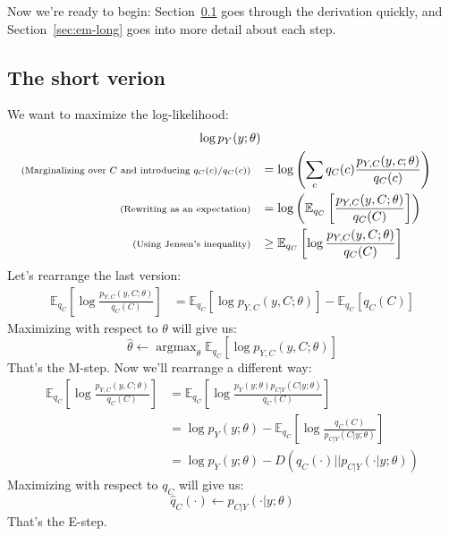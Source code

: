 \documentclass[12pt]{article}
\DeclareMathOperator*{\argmax}{\mathrm{argmax}}
\begin{document}
    Now we're ready to begin: Section~\ref{sec:em-short} goes through the
    derivation quickly, and Section~\ref{sec:em-long} goes into more detail
    about each step.
    \subsection{The short verion}
    \label{sec:em-short}
    We want to maximize the log-likelihood:
    \begin{align*}
        \log p_Y(y; \theta) \\
        \scriptsize{\text{(Marginalizing over $C$ and introducing $q_C(c)/q_C(c)$)}}\quad
            &= \log\left(\sum_c q_C(c) \frac{p_{Y,C}(y,c; \theta)}{q_C(c)}\right) \\
            \scriptsize{\text{(Rewriting as an expectation)}}\quad
            &= \log\left(\mathbb{E}_{q_C}\left[\frac{p_{Y,C}(y,C; \theta)}{q_C(C)}\right]\right)\\
            \scriptsize{\text{(Using Jensen's inequality)}}\quad
            &\geq \mathbb{E}_{q_C}\left[\log \frac{p_{Y,C}(y,C; \theta)}{q_C(C)} \right]
    \end{align*}
    Let's rearrange the last version:
    \begin{align*}
        \mathbb{E}_{q_C}\left[\log \frac{p_{Y,C}(y,C; \theta)}{q_C(C)} \right]
        &= \mathbb{E}_{q_C}\left[\log p_{Y,C}(y,C; \theta)\right] - \mathbb{E}_{q_C} [q_C(C)]
    \end{align*}
    Maximizing with respect to $\theta$ will give us:
    \begin{equation*}
        \boxed{\widehat{\theta} \gets \argmax_\theta \mathbb{E}_{q_C}\left[\log p_{Y,C}(y,C; \theta)\right]}
    \end{equation*}
    That's the M-step. Now we'll rearrange a different way:
    \begin{align*}
        \mathbb{E}_{q_C}\left[\log \frac{p_{Y,C}(y,C; \theta)}{q_C(C)} \right] 
        &= \mathbb{E}_{q_C}\left[\log \frac{p_{Y}(y; \theta)p_{C|Y}(C|y; \theta)}{q_C(C)} \right] \\
        &= \log p_{Y}(y; \theta) - \mathbb{E}_{q_C}\left[\log \frac{q_C(C)}{p_{C|Y}(C|y; \theta)}\right] \\
        &= \log p_{Y}(y; \theta) - D(q_C(\cdot)||p_{C|Y}(\cdot|y; \theta))
    \end{align*}
    Maximizing with respect to $q_C$ will give us:
    \begin{equation*}
        \boxed{\widehat{q}_C(\cdot) \gets p_{C|Y}(\cdot|y; \theta)}
    \end{equation*}
    That's the E-step.
\end{document}
